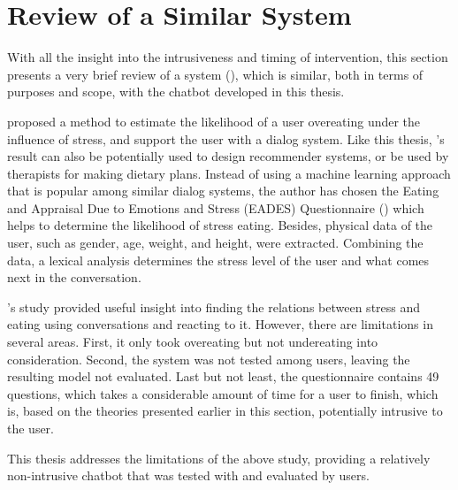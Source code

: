 \section{Review of a Similar System}
With all the insight into the intrusiveness and timing of intervention, this section presents a very brief review of a system (\cite{31_marija}), which is similar, both in terms of purposes and scope, with the chatbot developed in this thesis.

\citeauthor{31_marija} proposed a method to estimate the likelihood of a user overeating under the influence of stress, and support the user with a dialog system. Like this thesis, \citeauthor{31_marija}'s result can also be potentially used to design recommender systems, or be used by therapists for making dietary plans. Instead of using a machine learning approach that is popular among similar dialog systems, the author has chosen the Eating and Appraisal Due to Emotions and Stress (EADES) Questionnaire (\cite{33_eades}) which helps to determine the likelihood of stress eating. Besides, physical data of the user, such as gender, age, weight, and height, were extracted. Combining the data, a lexical analysis determines the stress level of the user and what comes next in the conversation.

\citeauthor{31_marija}'s study provided useful insight into finding the relations between stress and eating using conversations and reacting to it. However, there are limitations in several areas. First, it only took overeating but not undereating into consideration. Second, the system was not tested among users, leaving the resulting model not evaluated. Last but not least, the questionnaire contains 49 questions, which takes a considerable amount of time for a user to finish, which is, based on the theories presented earlier in this section, potentially intrusive to the user.\bigskip

\noindent This thesis addresses the limitations of the above study, providing a relatively non-intrusive chatbot that was tested with and evaluated by users.
